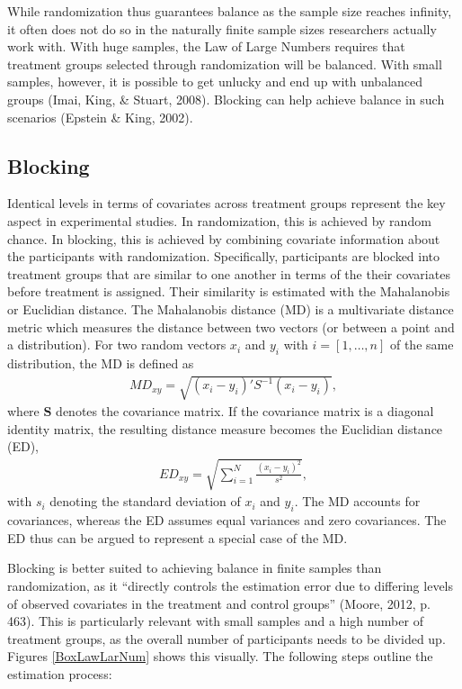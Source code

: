 \documentclass[12pt,econ]{sources/authesis}
\begin{document}
While randomization thus guarantees balance as the sample size reaches infinity, it often does not do so in the naturally finite sample sizes researchers actually work with. With huge samples, the Law of Large Numbers requires that treatment groups selected through randomization will be balanced. With small samples, however, it is possible to get unlucky and end up with unbalanced groups (Imai, King, \& Stuart, 2008). Blocking can help achieve balance in such scenarios (Epstein \& King, 2002).

\hypertarget{ordblock-theory-blocking}{%
\subsection{Blocking}\label{ordblock-theory-blocking}}

Identical levels in terms of covariates across treatment groups represent the key aspect in experimental studies. In randomization, this is achieved by random chance. In blocking, this is achieved by combining covariate information about the participants with randomization. Specifically, participants are blocked into treatment groups that are similar to one another in terms of the their covariates before treatment is assigned. Their similarity is estimated with the Mahalanobis or Euclidian distance. The Mahalanobis distance (MD) is a multivariate distance metric which measures the distance between two vectors (or between a point and a distribution). For two random vectors \(x_i\) and \(y_i\) with \(i = [1,\ldots,n]\) of the same distribution, the MD is defined as
\begin{align}
MD_{xy} = \sqrt{(x_i - y_i)' S^{-1} (x_i - y_i)},
\end{align}
where \(\bm{S}\) denotes the covariance matrix. If the covariance matrix is a diagonal identity matrix, the resulting distance measure becomes the Euclidian distance (ED),
\begin{align}
ED_{xy} = \sqrt{\sum_{i=1}^N \frac{(x_i - y_i)^2}{s^2}},
\end{align}
with \(s_i\) denoting the standard deviation of \(x_i\) and \(y_i\). The MD accounts for covariances, whereas the ED assumes equal variances and zero covariances. The ED thus can be argued to represent a special case of the MD.

Blocking is better suited to achieving balance in finite samples than randomization, as it ``directly controls the estimation error due to differing levels of observed covariates in the treatment and control groups'' (Moore, 2012, p. 463). This is particularly relevant with small samples and a high number of treatment groups, as the overall number of participants needs to be divided up. Figures \ref{BoxLawLarNum} shows this visually. The following steps outline the estimation process:
\end{document}
